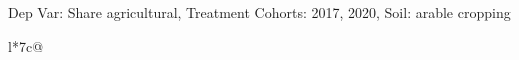 \begin{table}[H]
\captionlistentry[table]{}
\label{table:beaver_land_class_DVis_land_class_1_SCg23_SSAC}
\scriptsize %
Dep Var: Share agricultural, Treatment Cohorts: 2017, 2020, Soil: arable cropping \\
\begin{threeparttable}
\begin{tabulary}{\textwidth}{l*{7}{c}@{}}
\toprule \toprule
\noalign{\smallskip}
\noalign{\smallskip}
\midrule \bottomrule
\end{tabulary}
\medskip
\end{threeparttable}
\end{table}
